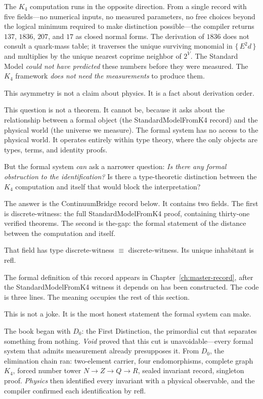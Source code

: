 \documentclass[11pt,a4paper]{book}
\def\mathbb#1{#1}%
\def\texttt#1{#1}%
\begin{document}
The $K_4$ computation runs in the opposite direction.  From a single record with five fields---no numerical inputs, no measured parameters, no free choices beyond the logical minimum required to make distinction possible---the compiler returns $137$, $1836$, $207$, and $17$ as closed normal forms.  The derivation of $1836$ does not consult a quark-mass table; it traverses the unique surviving monomial in $\{\,E^2 d\,\}$ and multiplies by the unique nearest coprime neighbor of $2^V$.  The Standard Model \emph{could not have predicted} these numbers before they were measured.  The $K_4$ framework \emph{does not need the measurements} to produce them.

This asymmetry is not a claim about physics.  It is a fact about derivation order.

This question is not a theorem. It cannot be, because it asks about the relationship between a formal object (the \texttt{StandardModelFromK4} record) and the physical world (the universe we measure). The formal system has no access to the physical world. It operates entirely within type theory, where the only objects are types, terms, and identity proofs.

But the formal system \emph{can} ask a narrower question: \emph{Is there any formal obstruction to the identification?} Is there a type-theoretic distinction between the $K_4$ computation and itself that would block the interpretation?

The answer is the \texttt{ContinuumBridge} record below. It contains two fields. The first is \texttt{discrete-witness}: the full \texttt{StandardModelFromK4} proof, containing thirty-one verified theorems. The second is \texttt{the-gap}: the formal statement of the distance between the computation and itself.

That field has type \texttt{discrete-witness $\equiv$ discrete-witness}. Its unique inhabitant is \texttt{refl}.

The formal definition of this record appears in Chapter~\ref{ch:master-record}, after the \texttt{StandardModelFromK4} witness it depends on has been constructed. The code is three lines. The meaning occupies the rest of this section.

This is not a joke. It is the most honest statement the formal system can make.

The book began with $D_0$: the First Distinction, the primordial cut that separates something from nothing. \textit{Void} proved that this cut is unavoidable---every formal system that admits measurement already presupposes it. From $D_0$, the elimination chain ran: two-element carrier, four endomorphisms, complete graph $K_4$, forced number tower $\mathbb{N} \to \mathbb{Z} \to \mathbb{Q} \to \mathbb{R}$, sealed invariant record, singleton proof. \textit{Physics} then identified every invariant with a physical observable, and the compiler confirmed each identification by \texttt{refl}.
\end{document}
